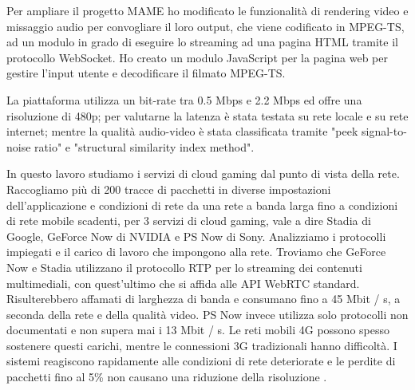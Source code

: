 Per ampliare il progetto MAME ho modificato le funzionalità di rendering video e missaggio audio per convogliare il loro output, che viene codificato in MPEG-TS, ad un modulo in grado di eseguire lo streaming ad una pagina HTML tramite il protocollo WebSocket. Ho creato un modulo JavaScript per la pagina web per gestire l'input utente e decodificare il filmato MPEG-TS.

La piattaforma utilizza un bit-rate tra 0.5 Mbps e 2.2 Mbps ed offre una risoluzione di 480p; per valutarne la latenza è stata testata su rete locale e su rete internet; mentre la qualità audio-video è stata classificata tramite "peek signal-to-noise ratio" e "structural similarity index method".






In questo lavoro studiamo i servizi di cloud gaming dal punto di vista della rete. Raccogliamo più di 200 tracce di pacchetti in diverse impostazioni dell'applicazione e condizioni di rete da una rete a banda larga fino a condizioni di rete mobile scadenti, per 3 servizi di cloud gaming, vale a dire Stadia di Google, GeForce Now di NVIDIA e PS Now di Sony. Analizziamo i protocolli impiegati e il carico di lavoro che impongono alla rete. Troviamo che GeForce Now e Stadia utilizzano il protocollo RTP per lo streaming dei contenuti multimediali, con quest'ultimo che si affida alle API WebRTC standard. Risulterebbero affamati di larghezza di banda e consumano fino a 45 Mbit / s, a seconda della rete e della qualità video. PS Now invece utilizza solo protocolli non documentati e non supera mai i 13 Mbit / s. Le reti mobili 4G possono spesso sostenere questi carichi, mentre le connessioni 3G tradizionali hanno difficoltà. I sistemi reagiscono rapidamente alle condizioni di rete deteriorate e le perdite di pacchetti fino al 5\% non causano una riduzione della risoluzione \parencite{A_Network_Analysis_on_Cloud_Gaming_Stadia_GeForce_Now_and_PSNow}.

